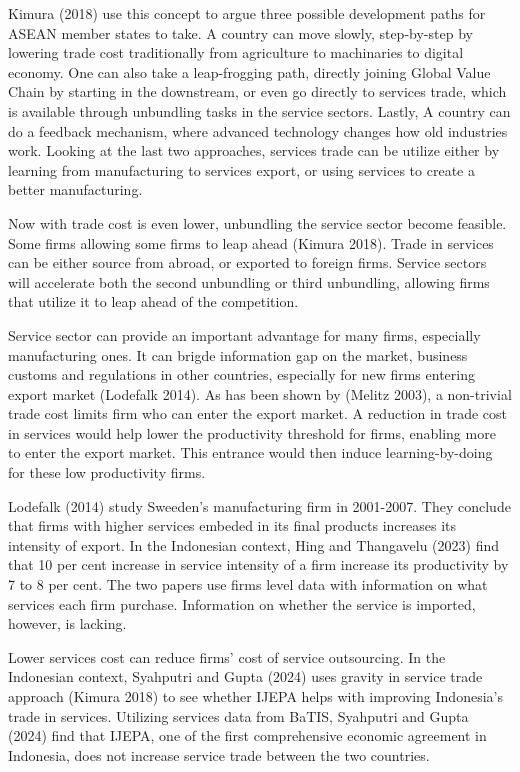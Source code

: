 \documentclass[
  letterpaper,
  DIV=11,
  numbers=noendperiod]{scrartcl}
\begin{document}
Kimura (2018) use this concept to argue three possible development paths
for ASEAN member states to take. A country can move slowly, step-by-step
by lowering trade cost traditionally from agriculture to machinaries to
digital economy. One can also take a leap-frogging path, directly
joining Global Value Chain by starting in the downstream, or even go
directly to services trade, which is available through unbundling tasks
in the service sectors. Lastly, A country can do a feedback mechanism,
where advanced technology changes how old industries work. Looking at
the last two approaches, services trade can be utilize either by
learning from manufacturing to services export, or using services to
create a better manufacturing.

Now with trade cost is even lower, unbundling the service sector become
feasible. Some firms allowing some firms to leap ahead (Kimura 2018).
Trade in services can be either source from abroad, or exported to
foreign firms. Service sectors will accelerate both the second
unbundling or third unbundling, allowing firms that utilize it to leap
ahead of the competition.

Service sector can provide an important advantage for many firms,
especially manufacturing ones. It can brigde information gap on the
market, business customs and regulations in other countries, especially
for new firms entering export market (Lodefalk 2014). As has been shown
by (Melitz 2003), a non-trivial trade cost limits firm who can enter the
export market. A reduction in trade cost in services would help lower
the productivity threshold for firms, enabling more to enter the export
market. This entrance would then induce learning-by-doing for these low
productivity firms.

Lodefalk (2014) study Sweeden's manufacturing firm in 2001-2007. They
conclude that firms with higher services embeded in its final products
increases its intensity of export. In the Indonesian context, Hing and
Thangavelu (2023) find that 10 per cent increase in service intensity of
a firm increase its productivity by 7 to 8 per cent. The two papers use
firms level data with information on what services each firm purchase.
Information on whether the service is imported, however, is lacking.

Lower services cost can reduce firms' cost of service outsourcing. In
the Indonesian context, Syahputri and Gupta (2024) uses gravity in
service trade approach (Kimura 2018) to see whether IJEPA helps with
improving Indonesia's trade in services. Utilizing services data from
BaTIS, Syahputri and Gupta (2024) find that IJEPA, one of the first
comprehensive economic agreement in Indonesia, does not increase service
trade between the two countries.
\end{document}
